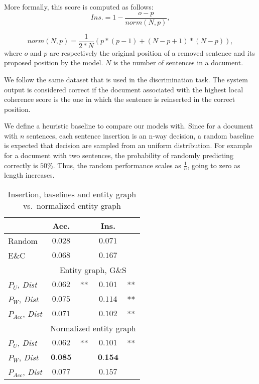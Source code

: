 More formally, this score is computed as follows:
\begin{equation}
Ins. = 1 - \frac{o - p}{norm(N, p)},
\end{equation}


\begin{equation}
norm(N, p) = \frac{1}{2*N} (p * (p-1) + (N - p + 1)*(N - p)),
\end{equation}
%
where $o$ and $p$ are respectively the original position of a removed sentence and its proposed position by the model. 
$N$ is the number of sentences in a document.  

We follow the same dataset that is used in the discrimination task.  
The system output is considered correct if the document associated with the highest local coherence score is
the one in which the sentence is reinserted in the correct position. 

We define a heuristic baseline to compare our models with. 
Since for a document with $n$ sentences, each sentence insertion is an n-way decision, a random baseline is expected that decision are sampled from an uniform distribution. 
For example for a document with two sentences, the probability of randomly predicting correctly is $50\%$. 
Thus, the random performance scales as $\frac{1}{n}$, going to zero as length increases.

\begin{table}[!b]
\centering
\begin{small}
\begin{tabular}{l|c@{}lc@{}l} 

		& Acc. & 	& Ins.  & \\\hline
 Random & $0.028$ & 	& $0.071$ & \\
 E\&C	& $0.068$ & 	& $0.167$ & \\\hline

		& \multicolumn{4}{|c}{Entity graph, G\&S} \\\hline 
 $P_U$, \textit{Dist} & $0.062$&** & $0.101$ & **\\
 $P_W$, \textit{Dist} & $0.075$& 	   & $0.114$ & **\\
 $P_{Acc}$, \textit{Dist} & $0.071$& 	 & $0.102$ & ** \\\hline
  & \multicolumn{4}{|c}{Normalized entity graph} \\\hline 
 $P_U$, \textit{Dist} & $0.062$&** & $0.101$ & **  \\
 $P_W$, \textit{Dist} & $\textbf{0.085}$& 	 & $\textbf{0.154}$&\\
 $P_{Acc}$, \textit{Dist} & $0.077$& 	 & $0.157$ & \\
\end{tabular}
\end{small}
\caption{Insertion, baselines and entity graph vs.\ normalized entity
  graph}\label{table:insertion_results} 
\end{table}

